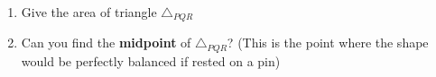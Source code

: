 \documentclass{article}
\begin{document}
\begin{enumerate}
\begin{enumerate}
		\item Give the area of triangle $\triangle_{PQR}$
		
		\item Can you find the \textbf{midpoint} of $\triangle_{PQR}$?  (This is the point where the shape would be perfectly balanced if rested on a pin)
	\end{enumerate}
	
\end{enumerate}
\end{document}
